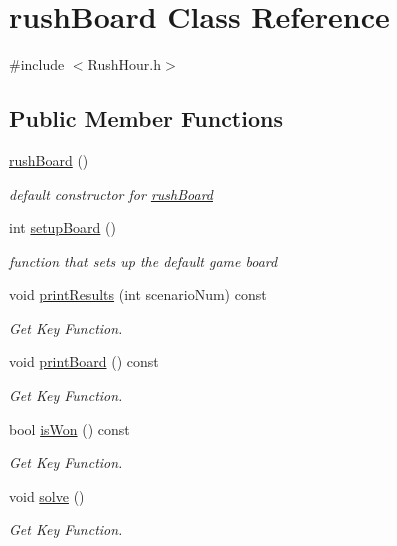 \hypertarget{classrush_board}{}\section{rush\+Board Class Reference}
\label{classrush_board}


{\ttfamily \#include $<$Rush\+Hour.\+h$>$}

\subsection*{Public Member Functions}
\begin{DoxyCompactItemize}
\item 
\hyperlink{classrush_board_a841da3003dbdbcd3a1819dd8bd1ae44a}{rush\+Board} ()
\begin{DoxyCompactList}\small\item\em default constructor for \hyperlink{classrush_board}{rush\+Board} \end{DoxyCompactList}\item 
int \hyperlink{classrush_board_a2e405bdfe956303bdfe542eead0e8f22}{setup\+Board} ()
\begin{DoxyCompactList}\small\item\em function that sets up the default game board \end{DoxyCompactList}\item 
void \hyperlink{classrush_board_ab89fd12a783d3655734b3544d46330ec}{print\+Results} (int scenario\+Num) const 
\begin{DoxyCompactList}\small\item\em Get Key Function. \end{DoxyCompactList}\item 
void \hyperlink{classrush_board_a83c9613d9e7d19f8032bb4c220f64081}{print\+Board} () const 
\begin{DoxyCompactList}\small\item\em Get Key Function. \end{DoxyCompactList}\item 
bool \hyperlink{classrush_board_acfe7888983f7f70c83fbd5b3c4ca8389}{is\+Won} () const 
\begin{DoxyCompactList}\small\item\em Get Key Function. \end{DoxyCompactList}\item 
void \hyperlink{classrush_board_ac9f90fd58cb5d9b91b304035d93056d3}{solve} ()
\begin{DoxyCompactList}\small\item\em Get Key Function. \end{DoxyCompactList}\end{DoxyCompactItemize}


